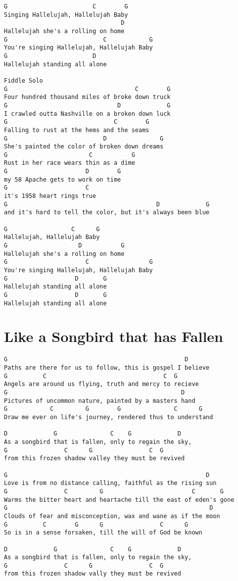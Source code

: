 \documentclass[leqno]{memoir}
\begin{document}
\begin{verbatim}
G                        C        G
Singing Hallelujah, Hallelujah Baby
                                 D
Hallelujah she's a rolling on home
G                           C            G
You're singing Hallelujah, Hallelujah Baby
G                        D
Hallelujah standing all alone

Fiddle Solo
G                                    C        G
Four hundred thousand miles of broke down truck
G                               D             G
I crawled outta Nashville on a broken down luck
G                              C        G
Falling to rust at the hems and the seams
G                           D               G
She's painted the color of broken down dreams
G                       C           G
Rust in her race wears thin as a dime
G                      D        G
my 58 Apache gets to work on time
G                      C
it's 1958 heart rings true
G                                          D             G
and it's hard to tell the color, but it's always been blue

G                  C      G
Hallelujah, Hallelujah Baby
G                    D           G
Hallelujah she's a rolling on home
G                      C                 G
You're singing Hallelujah, Hallelujah Baby
G                   D       G
Hallelujah standing all alone
G                   D       G
Hallelujah standing all alone
\end{verbatim}
\newpage

\chapter{Like a Songbird that has Fallen}
\begin{verbatim}
G                                                  D
Paths are there for us to follow, this is gospel I believe
G          C                                 C  G
Angels are around us flying, truth and mercy to recieve
G                                                 D
Pictures of uncommon nature, painted by a masters hand
G            C         G        G               C      G
Draw me ever on life's journey, rendered thus to understand

D             G               C    G             D
As a songbird that is fallen, only to regain the sky,
G                C      G                C  G
from this frozen shadow valley they must be revived

G                                                        D
Love is from no distance calling, faithful as the rising sun
G                C         G                         C       G
Warms the bitter heart and heartache till the east of eden's gone
G                                                         D
Clouds of fear and misconception, wax and wane as if the moon
G          C        G      G                C      G
So is in a sense forsaken, till the will of God be known

D             G               C    G             D
As a songbird that is fallen, only to regain the sky,
G                C      G                C  G
from this frozen shadow vally they must be revived
\end{verbatim}
\newpage
\end{document}
